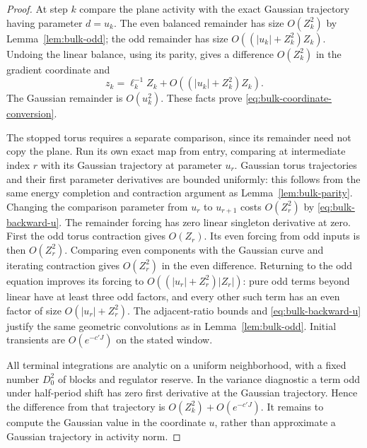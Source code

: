 \begin{proof}
At step $k$ compare the plane activity with the exact Gaussian
trajectory having parameter $d=u_k$.  The even balanced remainder
has size $O(Z_k^2)$ by Lemma~\ref{lem:bulk-odd}; the odd remainder
has size $O((|u_k|+Z_k^2)Z_k)$.  Undoing the linear balance,
using its parity, gives a difference $O(Z_k^2)$ in the gradient
coordinate and
\begin{equation}\label{eq:bulk-z-conversion}
 z_k=\ell_k^{-1}Z_k+O((|u_k|+Z_k^2)Z_k).
\end{equation}
The Gaussian remainder is $O(u_k^2)$.  These facts prove
\eqref{eq:bulk-coordinate-conversion}.

The stopped torus requires a separate comparison, since its
remainder need not copy the plane.  Run its own exact map from
entry, comparing at intermediate index $r$ with its Gaussian
trajectory at parameter $u_r$.  Gaussian torus trajectories
and their first parameter derivatives are bounded uniformly:
this follows from the same energy completion and contraction
argument as Lemma~\ref{lem:bulk-parity}.  Changing the comparison
parameter from $u_r$ to $u_{r+1}$ costs $O(Z_r^2)$ by
\eqref{eq:bulk-backward-u}.  The remainder forcing has zero
linear singleton derivative at zero.  First the odd torus
contraction gives $O(Z_r)$.  Its even forcing from odd inputs
is then $O(Z_r^2)$.  Comparing even components with the Gaussian
curve and iterating contraction gives $O(Z_r^2)$ in the even
difference.  Returning to the odd equation improves its forcing
to $O((|u_r|+Z_r^2)|Z_r|)$: pure odd terms beyond linear have
at least three odd factors, and every other such term has an
even factor of size $O(|u_r|+Z_r^2)$.  The adjacent-ratio bounds
and \eqref{eq:bulk-backward-u} justify the same geometric
convolutions as in Lemma~\ref{lem:bulk-odd}.  Initial transients
are $O(e^{-c'J})$ on the stated window.

All terminal integrations are analytic on a uniform neighborhood,
with a fixed number $D_0^2$ of blocks and regulator reserve.
In the variance diagnostic a term odd under half-period shift
has zero first derivative at the Gaussian trajectory.  Hence
the difference from that trajectory is $O(Z_k^2)+O(e^{-c'J})$.
It remains to compute the Gaussian value in the coordinate $u$,
rather than approximate a Gaussian trajectory in activity norm.


\end{proof}

